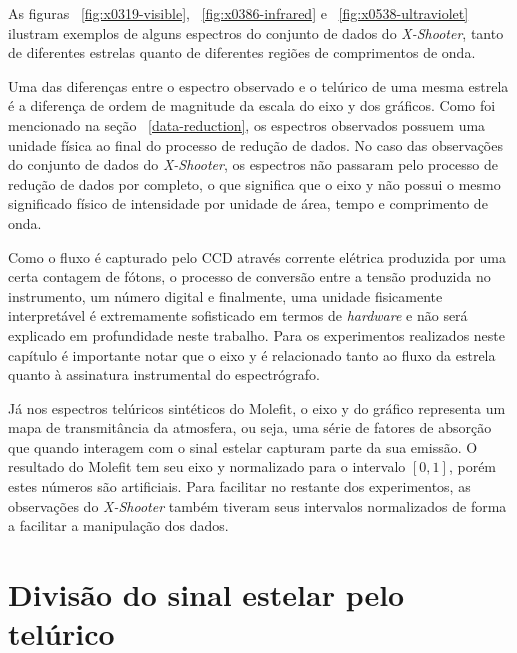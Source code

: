 As figuras ~\ref{fig:x0319-visible}, ~\ref{fig:x0386-infrared} e ~\ref{fig:x0538-ultraviolet} ilustram exemplos de alguns espectros do conjunto de dados do \textit{X-Shooter}, tanto de diferentes estrelas quanto de diferentes regiões de comprimentos de onda. 

Uma das diferenças entre o espectro observado e o telúrico de uma mesma estrela é a diferença de ordem de magnitude da escala do eixo y dos gráficos. Como foi mencionado na seção ~\ref{data-reduction}, os espectros observados possuem uma unidade física ao final do processo de redução de dados. No caso das observações do conjunto de dados do \textit{X-Shooter}, os espectros não passaram pelo processo de redução de dados por completo, o que significa que o eixo y não possui o mesmo significado físico de intensidade por unidade de área, tempo e comprimento de onda. 

Como o fluxo é capturado pelo CCD através corrente elétrica produzida por uma certa contagem de fótons, o processo de conversão entre a tensão produzida no instrumento, um número digital e finalmente, uma unidade fisicamente interpretável é extremamente sofisticado em termos de \textit{hardware} e não será explicado em profundidade neste trabalho. Para os experimentos realizados neste capítulo é importante notar que o eixo y é relacionado tanto ao fluxo da estrela quanto à assinatura instrumental do espectrógrafo. 

Já nos espectros telúricos sintéticos do Molefit, o eixo y do gráfico representa um mapa de transmitância da atmosfera, ou seja, uma série de fatores de absorção que quando interagem com o sinal estelar capturam parte da sua emissão. O resultado do Molefit tem seu eixo y normalizado para o intervalo $[0, 1]$, porém estes números são artificiais. Para facilitar no restante dos experimentos, as observações do \textit{X-Shooter} também tiveram seus intervalos normalizados de forma a facilitar a manipulação dos dados.

\section{Divisão do sinal estelar pelo telúrico}


